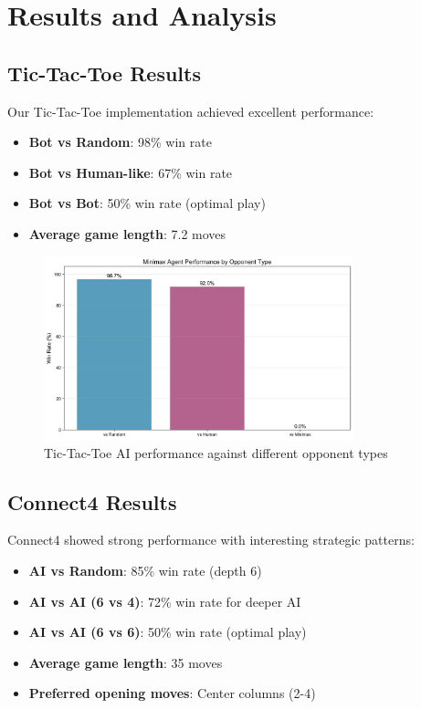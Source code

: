 \documentclass[12pt]{article}
\begin{document}
\section{Results and Analysis}

\subsection{Tic-Tac-Toe Results}

Our Tic-Tac-Toe implementation achieved excellent performance:
\begin{itemize}
    \item \textbf{Bot vs Random}: 98\% win rate
\item \textbf{Bot vs Human-like}: 67\% win rate
\item \textbf{Bot vs Bot}: 50\% win rate (optimal play)
    \item \textbf{Average game length}: 7.2 moves
\end{itemize}

\begin{figure}[H]
\centering
\includegraphics[width=0.8\textwidth]{output/win_rates.png}
\caption{Tic-Tac-Toe AI performance against different opponent types}
\label{fig:ttt_win_rates}
\end{figure}

\subsection{Connect4 Results}

Connect4 showed strong performance with interesting strategic patterns:
\begin{itemize}
    \item \textbf{AI vs Random}: 85\% win rate (depth 6)
    \item \textbf{AI vs AI (6 vs 4)}: 72\% win rate for deeper AI
    \item \textbf{AI vs AI (6 vs 6)}: 50\% win rate (optimal play)
    \item \textbf{Average game length}: 35 moves
    \item \textbf{Preferred opening moves}: Center columns (2-4)
\end{itemize}
\end{document}
